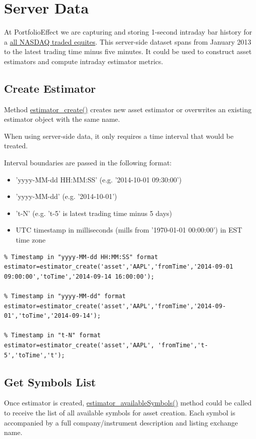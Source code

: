 \documentclass[letterpaper]{report}
\newcounter{N}
\begin{document}
\section{Server Data}
At PortfolioEffect we are capturing and storing 1-second intraday bar history for a 
\href{https://www.portfolioeffect.com/docs/symbology}{all NASDAQ traded equites}.
This server-side dataset spans from January 2013 to the latest trading time minus five minutes. 
It could be used to construct asset estimators and compute intraday estimator metrics.
\subsection {Create Estimator}
Method
\href{https://www.portfolioeffect.com/docs/platform/quant/functions/general-functions/estimator-create}{estimator\_create()}
creates new asset estimator or overwrites an existing estimator object with the
same name. \par
When using server-side data, it only requires a time interval that would be treated.
\par
Interval boundaries are passed in the following format:
\begin{itemize} 
  \item 'yyyy-MM-dd HH:MM:SS' (e.g. '2014-10-01 09:30:00')
  \item 'yyyy-MM-dd' (e.g. '2014-10-01')
  \item 't-N' (e.g. 't-5' is latest trading time minus 5 days)
  \item UTC timestamp in milliseconds (mills from '1970-01-01 00:00:00') in EST
  time zone
\end{itemize}
\begin{lstlisting}
% Timestamp in "yyyy-MM-dd HH:MM:SS" format
estimator=estimator_create('asset','AAPL','fromTime','2014-09-01 09:00:00','toTime','2014-09-14 16:00:00');

% Timestamp in "yyyy-MM-dd" format
estimator=estimator_create('asset','AAPL','fromTime','2014-09-01','toTime','2014-09-14');

% Timestamp in "t-N" format
estimator=estimator_create('asset','AAPL', 'fromTime','t-5','toTime','t');
\end{lstlisting}

\subsection {Get Symbols List}
Once estimator is created, 
\href{https://www.portfolioeffect.com/docs/platform/quant/functions/general-functions/estimator-available-symbols}{estimator\_availableSymbols()} 
method could be called to receive the list of all available symbols for asset creation. 
Each symbol is accompanied by a full company/instrument description and listing exchange name.
\end{document}
